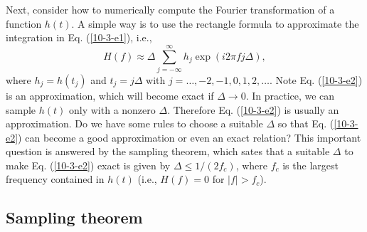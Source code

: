 \documentclass{article}
\begin{document}
Next, consider how to numerically compute the Fourier transformation of a
function $h (t)$. A simple way is to use the rectangle formula to approximate
the integration in Eq. (\ref{10-3-e1}), i.e.,
\begin{equation}
  \label{10-3-e2} H (f) \approx \Delta \sum_{j = - \infty}^{\infty} h_j \exp
  (i 2 \pi f j \Delta),
\end{equation}
where $h_j = h (t_j)$ and $t_j = j \Delta$ with $j = \ldots, - 2, - 1, 0, 1,
2, \ldots$. Note Eq. (\ref{10-3-e2}) is an approximation, which will become
exact if $\Delta \rightarrow 0$. In practice, we can sample $h (t)$ only with
a nonzero $\Delta$. Therefore Eq. (\ref{10-3-e2}) is usually an approximation.
Do we have some rules to choose a suitable $\Delta$ so that Eq.
(\ref{10-3-e2}) can become a good approximation or even an exact relation?
This important question is answered by the sampling theorem, which sates that
a suitable $\Delta$ to make Eq. (\ref{10-3-e2}) exact is given by $\Delta
\leqslant 1 / (2 f_c)$, where $f_c$ is the largest frequency contained in $h
(t)$ (i.e., $H (f) = 0$ for $|f| > f_c$).

\subsection{Sampling theorem}
\end{document}

